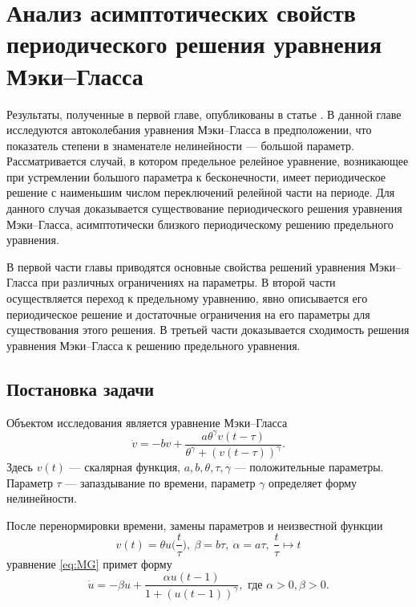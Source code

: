 \chapter{Анализ асимптотических свойств периодического решения уравнения Мэки--Гласса}\label{ch:ch1}

Результаты, полученные в первой главе, опубликованы в статье \cite{wosbib1}. В данной главе исследуются автоколебания уравнения Мэки--Гласса в предположении, что показатель степени в знаменателе нелинейности --- большой параметр. Рассматривается случай, в котором предельное релейное уравнение, возникающее при устремлении большого параметра к бесконечности, имеет периодическое решение с наименьшим числом переключений релейной части на периоде. Для данного случая доказывается существование периодического решения уравнения Мэки--Гласса, асимптотически близкого периодическому решению предельного уравнения.

В первой части главы приводятся основные свойства решений уравнения Мэки--Гласса при различных ограничениях на параметры. В второй части осуществляется переход к предельному уравнению, явно описывается его периодическое решение и достаточные ограничения на его параметры для существования этого решения. В третьей части доказывается сходимость решения уравнения Мэки--Гласса к решению предельного уравнения.

\section{Постановка задачи}\label{sec:ch1/sec1}

Объектом исследования является уравнение Мэки--Гласса 
\cite{Mackey1977, Glass1988}
\begin{equation}
	\label{eq:MG}
	\dot{v}=-b v+\frac{a \theta^{\gamma} v(t-\tau)}{\theta^{\gamma}+(v(t-\tau))^{\gamma}}.
\end{equation}
Здесь $v(t)$ --- скалярная функция, $a, b, \theta, \tau, \gamma$ --- положительные параметры. Параметр $\tau$ --- запаздывание по времени, параметр $\gamma$ определяет форму нелинейности.

После перенормировки времени, замены параметров и неизвестной функции 
\begin{equation}
	\label{eq:substitutions_v}
	v(t) = \theta u\Big(\frac{t}{\tau}\Big),\ \beta = b\tau,\ \alpha=a\tau, \ \frac{t}{\tau} \mapsto t
\end{equation}
уравнение \eqref{eq:MG} примет форму
\begin{equation}
	\label{eq:MG_norm}
	\dot{u}=-\beta u+\frac{\alpha u(t-1)}{1+(u(t-1))^\gamma}, \text{ где } \alpha > 0, \beta > 0.
\end{equation}

